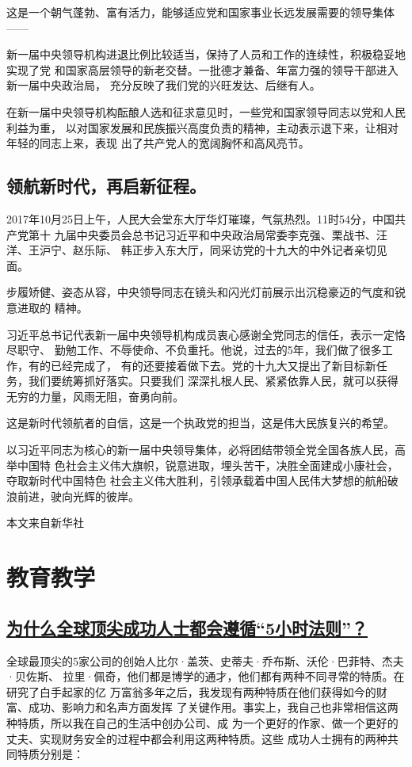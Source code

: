 \documentclass[11pt]{ctexart}
\begin{document}
{{{{这是一个朝气蓬勃、富有活力，能够适应党和国家事业长远发展需要的领导集体——

新一届中央领导机构进退比例比较适当，保持了人员和工作的连续性，积极稳妥地实现了党
和国家高层领导的新老交替。一批德才兼备、年富力强的领导干部进入新一届中央政治局，
充分反映了我们党的兴旺发达、后继有人。

在新一届中央领导机构酝酿人选和征求意见时，一些党和国家领导同志以党和人民利益为重，
以对国家发展和民族振兴高度负责的精神，主动表示退下来，让相对年轻的同志上来，表现
出了共产党人的宽阔胸怀和高风亮节。

\subsection{领航新时代，再启新征程。}
\label{sec:orgd718cb2}

2017年10月25日上午，人民大会堂东大厅华灯璀璨，气氛热烈。11时54分，中国共产党第十
九届中央委员会总书记习近平和中央政治局常委李克强、栗战书、汪洋、王沪宁、赵乐际、
韩正步入东大厅，同采访党的十九大的中外记者亲切见面。



步履矫健、姿态从容，中央领导同志在镜头和闪光灯前展示出沉稳豪迈的气度和锐意进取的
精神。

习近平总书记代表新一届中央领导机构成员衷心感谢全党同志的信任，表示一定恪尽职守、
勤勉工作、不辱使命、不负重托。他说，过去的5年，我们做了很多工作，有的已经完成了，
有的还要接着做下去。党的十九大又提出了新目标新任务，我们要统筹抓好落实。只要我们
深深扎根人民、紧紧依靠人民，就可以获得无穷的力量，风雨无阻，奋勇向前。

这是新时代领航者的自信，这是一个执政党的担当，这是伟大民族复兴的希望。

以习近平同志为核心的新一届中央领导集体，必将团结带领全党全国各族人民，高举中国特
色社会主义伟大旗帜，锐意进取，埋头苦干，决胜全面建成小康社会，夺取新时代中国特色
社会主义伟大胜利，引领承载着中国人民伟大梦想的航船破浪前进，驶向光辉的彼岸。

本文来自新华社
\section{教育教学}
\label{sec:org42a87e8}
\subsection{\href{http://www.sohu.com/a/229047360\_114778?\_f=index\_chan30news\_28}{为什么全球顶尖成功人士都会遵循“5小时法则”？}}
\label{sec:orge4fb6ed}
全球最顶尖的5家公司的创始人﻿比尔·盖茨、史蒂夫·乔布斯、沃伦·巴菲特、杰夫·贝佐斯、
拉里·佩奇，他们都是博学的通才，他们都有两种不同寻常的特质。在研究了白手起家的亿
万富翁多年之后，我发现有两种特质在他们获得如今的财富、成功、影响力和名声方面发挥
了关键作用。事实上，我自己也非常相信这两种特质，所以我在自己的生活中创办公司、成
为一个更好的作家、做一个更好的丈夫、实现财务安全的过程中都会利用这两种特质。这些
成功人士拥有的两种共同特质分别是：

}}}}
\end{document}
